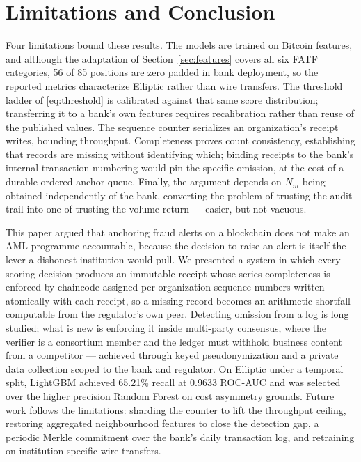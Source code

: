 \documentclass[conference]{IEEEtran}
\begin{document}
\section{Limitations and Conclusion}

Four limitations bound these results. The models are trained on Bitcoin
features, and although the adaptation of Section~\ref{sec:features} covers all
six FATF categories, 56 of 85 positions are zero padded in bank deployment, so
the reported metrics characterize Elliptic rather than wire transfers. The
threshold ladder of \eqref{eq:threshold} is calibrated against that same score
distribution; transferring it to a bank's own features requires recalibration
rather than reuse of the published values. The sequence counter serializes an organization's receipt writes, bounding
throughput. Completeness proves count consistency, establishing that records are
missing without identifying which; binding receipts to the bank's internal
transaction numbering would pin the specific omission, at the cost of a durable
ordered anchor queue. Finally, the argument depends on $N_m$ being obtained
independently of the bank, converting the problem of trusting the audit trail
into one of trusting the volume return --- easier, but not vacuous.

This paper argued that anchoring fraud alerts on a blockchain does not make an
AML programme accountable, because the decision to raise an alert is itself the
lever a dishonest institution would pull. We presented a system in which every
scoring decision produces an immutable receipt whose series completeness is
enforced by chaincode assigned per organization sequence numbers written
atomically with each receipt, so a missing record becomes an arithmetic
shortfall computable from the regulator's own peer. Detecting omission from a
log is long studied; what is new is enforcing it inside multi-party consensus,
where the verifier is a consortium member and the ledger must withhold business
content from a competitor --- achieved through keyed pseudonymization and a
private data collection scoped to the bank and regulator. On Elliptic under a
temporal split, LightGBM achieved 65.21\% recall at 0.9633 ROC-AUC and was
selected over the higher precision Random Forest on cost asymmetry grounds.
Future work follows the limitations: sharding the counter to lift the throughput
ceiling, restoring aggregated neighbourhood features to close the detection gap,
a periodic Merkle commitment over the bank's daily transaction log, and
retraining on institution specific wire transfers.
\end{document}
